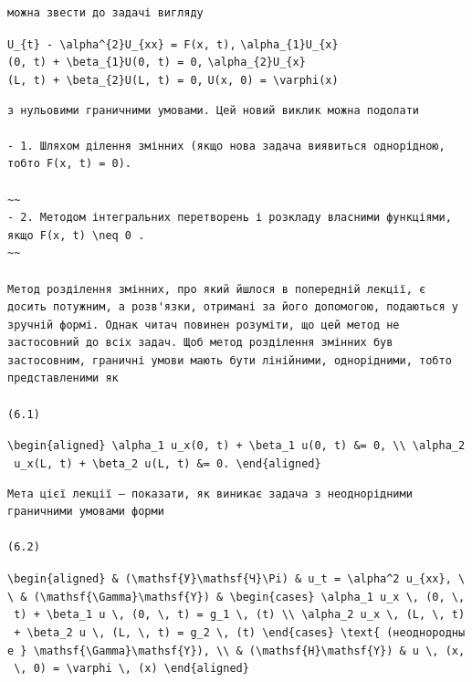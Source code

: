 \documentclass[
  ukrainian,
]{article}
\begin{document}
\begin{verbatim}
можна звести до задачі вигляду
\end{verbatim}

\texttt{U\_\{t\}\ -\ \textbackslash{}alpha\^{}\{2\}U\_\{xx\}\ =\ F(x,\ t),}
\texttt{\textbackslash{}alpha\_\{1\}U\_\{x\}(0,\ t)\ +\ \textbackslash{}beta\_\{1\}U(0,\ t)\ =\ 0,}
\texttt{\textbackslash{}alpha\_\{2\}U\_\{x\}(L,\ t)\ +\ \textbackslash{}beta\_\{2\}U(L,\ t)\ =\ 0,}
\texttt{U(x,\ 0)\ =\ \textbackslash{}varphi(x)}

\begin{verbatim}
з нульовими граничними умовами. Цей новий виклик можна подолати

- 1. Шляхом ділення змінних (якщо нова задача виявиться однорідною, тобто F(x, t) = 0).

~~
- 2. Методом інтегральних перетворень і розкладу власними функціями, якщо F(x, t) \neq 0 .
~~

Метод розділення змінних, про який йшлося в попередній лекції, є досить потужним, а розв'язки, отримані за його допомогою, подаються у зручній формі. Однак читач повинен розуміти, що цей метод не застосовний до всіх задач. Щоб метод розділення змінних був застосовним, граничні умови мають бути лінійними, однорідними, тобто представленими як

(6.1)
\end{verbatim}

\texttt{\textbackslash{}begin\{aligned\}\ \textbackslash{}alpha\_1\ u\_x(0,\ t)\ +\ \textbackslash{}beta\_1\ u(0,\ t)\ \&=\ 0,\ \textbackslash{}\textbackslash{}\ \textbackslash{}alpha\_2\ u\_x(L,\ t)\ +\ \textbackslash{}beta\_2\ u(L,\ t)\ \&=\ 0.\ \textbackslash{}end\{aligned\}}

\begin{verbatim}
Мета цієї лекції — показати, як виникає задача з неоднорідними граничними умовами форми

(6.2)
\end{verbatim}

\texttt{\textbackslash{}begin\{aligned\}\ \&\ (\textbackslash{}mathsf\{У\}\textbackslash{}mathsf\{Ч\}\textbackslash{}Pi)\ \&\ u\_t\ =\ \textbackslash{}alpha\^{}2\ u\_\{xx\},\ \textbackslash{}\textbackslash{}\ \&\ (\textbackslash{}mathsf\{\textbackslash{}Gamma\}\textbackslash{}mathsf\{Y\})\ \&\ \textbackslash{}begin\{cases\}\ \textbackslash{}alpha\_1\ u\_x\ \textbackslash{},\ (0,\ \textbackslash{},\ t)\ +\ \textbackslash{}beta\_1\ u\ \textbackslash{},\ (0,\ \textbackslash{},\ t)\ =\ g\_1\ \textbackslash{},\ (t)\ \textbackslash{}\textbackslash{}\ \textbackslash{}alpha\_2\ u\_x\ \textbackslash{},\ (L,\ \textbackslash{},\ t)\ +\ \textbackslash{}beta\_2\ u\ \textbackslash{},\ (L,\ \textbackslash{},\ t)\ =\ g\_2\ \textbackslash{},\ (t)\ \textbackslash{}end\{cases\}\ \textbackslash{}text\{\ (неоднородные\ \}\ \textbackslash{}mathsf\{\textbackslash{}Gamma\}\textbackslash{}mathsf\{Y\}),\ \textbackslash{}\textbackslash{}\ \&\ (\textbackslash{}mathsf\{H\}\textbackslash{}mathsf\{Y\})\ \&\ u\ \textbackslash{},\ (x,\ \textbackslash{},\ 0)\ =\ \textbackslash{}varphi\ \textbackslash{},\ (x)\ \textbackslash{}end\{aligned\}}
\end{document}
